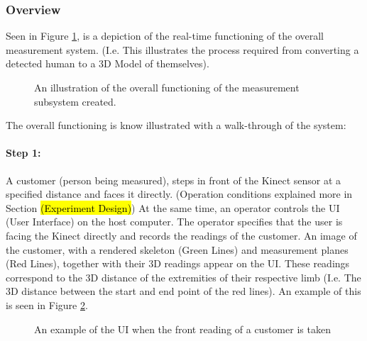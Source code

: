 \subsubsection{Overview}
Seen in Figure \ref{fig:overallAlgorithm}, is a depiction of the real-time functioning of the overall measurement system. (I.e. This illustrates the process required from converting a detected human to a 3D Model of themselves). 

\begin{figure}[ht]
	\centering
	{%
		\setlength{\fboxsep}{0pt}%
		\setlength{\fboxrule}{0.5pt}%
		}
	\caption{An illustration of the overall functioning of the measurement subsystem created.}
	\label{fig:overallAlgorithm}
\end{figure}

The overall functioning is know illustrated with a walk-through of the system:

\paragraph{Step 1: } A customer (person being measured), steps in front of the Kinect sensor at a specified distance and faces it directly. (Operation conditions explained more in Section \hl{(Experiment Design)}) At the same time, an operator controls the UI (User Interface) on the host computer. The operator specifies that the user is facing the Kinect directly and records the readings of the customer. An image of the customer, with a rendered skeleton (Green Lines) and measurement planes (Red Lines), together with their 3D readings appear on the UI. These readings correspond to the 3D distance of the extremities of their respective limb (I.e. The 3D distance between the start and end point of the red lines). An example of this is seen in Figure \ref{fig:designVol2Front}. 

\begin{figure}[ht]
	\centering
	{%
		\setlength{\fboxsep}{0pt}%
		\setlength{\fboxrule}{0.5pt}%
		}
	\caption{An example of the UI when the front reading of a customer is taken}
	\label{fig:designVol2Front}
\end{figure}

